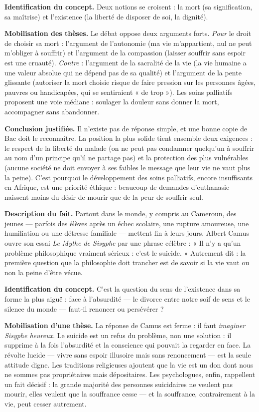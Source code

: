 \documentclass[11pt]{article}
\newcommand{\cle}[1]{{\popxbold\color{popdark}#1}}
\newcounter{popsec}
\newcounter{popsub}
\newcommand{\courssub}[1]{%
  \stepcounter{popsub}%
  \par\vspace{9pt}\noindent{\popxbold\fontsize{11.5}{13}\selectfont\color{popink}{\color{poporange}\thepopsec.\thepopsub}\hspace{6pt}#1}\par\nopagebreak\vspace{4pt}
}
\begin{document}
\textbf{Identification du concept.} Deux notions se croisent : la \cle{mort} (sa signification, sa maîtrise) et l'\cle{existence} (la liberté de disposer de soi, la dignité).

\textbf{Mobilisation des thèses.} Le débat oppose deux arguments forts. \emph{Pour} le droit de choisir sa mort : l'argument de l'autonomie (ma vie m'appartient, nul ne peut m'obliger à souffrir) et l'argument de la compassion (laisser souffrir sans espoir est une cruauté). \emph{Contre} : l'argument de la sacralité de la vie (la vie humaine a une valeur absolue qui ne dépend pas de sa qualité) et l'argument de la pente glissante (autoriser la mort choisie risque de faire pression sur les personnes âgées, pauvres ou handicapées, qui se sentiraient « de trop »). Les soins palliatifs proposent une voie médiane : soulager la douleur sans donner la mort, accompagner sans abandonner.

\textbf{Conclusion justifiée.} Il n'existe pas de réponse simple, et une bonne copie de Bac doit le reconnaître. La position la plus solide tient ensemble deux exigences : le respect de la liberté du malade (on ne peut pas condamner quelqu'un à souffrir au nom d'un principe qu'il ne partage pas) et la protection des plus vulnérables (aucune société ne doit envoyer à ses faibles le message que leur vie ne vaut plus la peine). C'est pourquoi le développement des soins palliatifs, encore insuffisants en Afrique, est une priorité éthique : beaucoup de demandes d'euthanasie naissent moins du désir de mourir que de la peur de souffrir seul.

\courssub{Situation 5 : le suicide chez les jeunes — la question de Camus}

\textbf{Description du fait.} Partout dans le monde, y compris au Cameroun, des jeunes — parfois des élèves après un échec scolaire, une rupture amoureuse, une humiliation ou une détresse familiale — mettent fin à leurs jours. Albert Camus ouvre son essai \emph{Le Mythe de Sisyphe} par une phrase célèbre : « Il n'y a qu'un problème philosophique vraiment sérieux : c'est le suicide. » Autrement dit : la première question que la philosophie doit trancher est de savoir si la vie vaut ou non la peine d'être vécue.

\textbf{Identification du concept.} C'est la question du \cle{sens de l'existence} dans sa forme la plus aiguë : face à l'absurdité — le divorce entre notre soif de sens et le silence du monde — faut-il renoncer ou persévérer ?

\textbf{Mobilisation d'une thèse.} La réponse de Camus est ferme : il faut \emph{imaginer Sisyphe heureux}. Le suicide est un refus du problème, non une solution : il supprime à la fois l'absurdité et la conscience qui pouvait la regarder en face. La révolte lucide — vivre sans espoir illusoire mais sans renoncement — est la seule attitude digne. Les traditions religieuses ajoutent que la vie est un don dont nous ne sommes pas propriétaires mais dépositaires. Les psychologues, enfin, rappellent un fait décisif : la grande majorité des personnes suicidaires ne veulent pas mourir, elles veulent que la souffrance cesse — et la souffrance, contrairement à la vie, peut cesser autrement.
\end{document}
